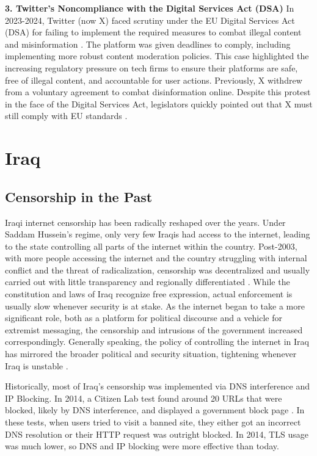 \textbf{3. Twitter's Noncompliance with the Digital Services Act (DSA)}
In 2023-2024, Twitter (now X) faced scrutiny under the EU Digital Services Act (DSA) for failing to implement the required measures to combat illegal content and misinformation \cite{twitter2023}. The platform was given deadlines to comply, including implementing more robust content moderation policies. This case highlighted the increasing regulatory pressure on tech firms to ensure their platforms are safe, free of illegal content, and accountable for user actions. Previously, X withdrew from a voluntary agreement to combat disinformation online. Despite this protest in the face of the Digital Services Act, legislators quickly pointed out that X must still comply with EU standards \cite{bhr2023}.

\section{Iraq}
\label{sec:Iraq-Censorship}

\subsection{Censorship in the Past}

Iraqi internet censorship has been radically reshaped over the years. Under Saddam Hussein's regime, only very few Iraqis had access to the internet, leading to the state controlling all parts of the internet within the country. Post-2003, with more people accessing the internet and the country struggling with internal conflict and the threat of radicalization, censorship was decentralized and usually carried out with little transparency and regionally differentiated \cite{USDoSHumanRights2012}. While the constitution and laws of Iraq recognize free expression, actual enforcement is usually slow whenever security is at stake. As the internet began to take a more significant role, both as a platform for political discourse and a vehicle for extremist messaging, the censorship and intrusions of the government increased correspondingly. Generally speaking, the policy of controlling the internet in Iraq has mirrored the broader political and security situation, tightening whenever Iraq is unstable \cite{freedomhouseIraqFreedom}.

Historically, most of Iraq's censorship was implemented via DNS interference and IP Blocking. In 2014, a Citizen Lab test found around 20 URLs that were blocked, likely by DNS interference, and displayed a government block page \cite{citizenlabIraqPastCensorship}. In these tests, when users tried to visit a banned site, they either got an incorrect DNS resolution or their HTTP request was outright blocked. In 2014, TLS usage was much lower, so DNS and IP blocking were more effective than today. 

